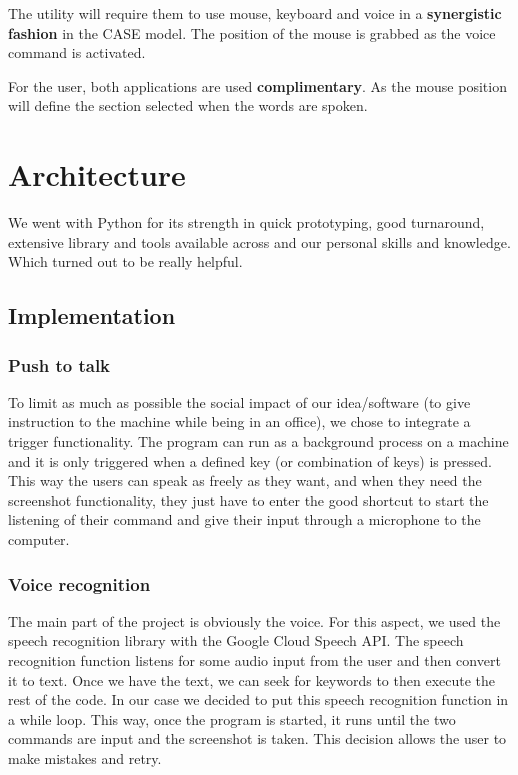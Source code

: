 The utility will require them to use mouse, keyboard and voice in a \textbf{synergistic fashion} in the CASE model.
The position of the mouse is grabbed as the voice command is activated.

For the user, both applications are used \textbf{complimentary}.
As the mouse position will define the section selected when the words are spoken. 

\section{Architecture}
We went with Python for its strength in quick prototyping, good turnaround, extensive library and tools available across and our personal skills and knowledge.
Which turned out to be really helpful.

\subsection{Implementation}
\subsubsection*{Push to talk}
To limit as much as possible the social impact of our idea/software (to give instruction to the machine while being in an office), we chose to integrate a trigger functionality. The program can run as a background process on a machine and it is only triggered when a defined key (or combination of keys) is pressed. This way the users can speak as freely as they want, and when they need the screenshot functionality, they just have to enter the good shortcut to start the listening of their command and give their input  through a microphone to the computer.

\subsubsection*{Voice recognition}
The main part of the project is obviously the voice.
For this aspect, we used the speech recognition library with the Google Cloud Speech API.
The speech recognition function listens for some audio input from the user and then convert it to text. Once we have the text, we can seek for keywords to then execute the rest of the code.
In our case we decided to put this speech recognition function in a while loop. This way, once the program is started, it runs until the two commands are input and the screenshot is taken. This decision allows the user to make mistakes and retry.

